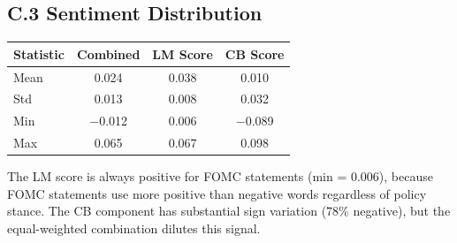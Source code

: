 \documentclass[12pt]{article}
\begin{document}
\subsection{C.3 Sentiment Distribution}

\begin{table}[htbp]\centering
\begin{tabular}{lccc}\toprule
Statistic & Combined & LM Score & CB Score \\\midrule
Mean & 0.024 & 0.038 & 0.010 \\
Std & 0.013 & 0.008 & 0.032 \\
Min & $-$0.012 & 0.006 & $-$0.089 \\
Max & 0.065 & 0.067 & 0.098 \\
\bottomrule\end{tabular}
\end{table}

The LM score is always positive for FOMC statements (min = 0.006), because FOMC statements use more positive than negative words regardless of policy stance. The CB component has substantial sign variation (78\% negative), but the equal-weighted combination dilutes this signal.
\end{document}
